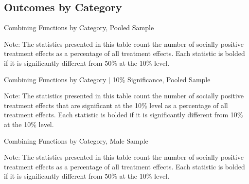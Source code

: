\subsection{{Outcomes by Category}} \label{appendix:morebycat}


	\begin{sidewaystable}[H]
	\begin{threeparttable}
     \caption{Combining Functions by Category, Pooled Sample} 
     \label{table:abccare_rslt_pooled_counts_n50a100_all}
	
		\begin{tablenotes}
	\footnotesize
	\item Note: The statistics presented in this table count the number of socially positive treatment 
	 effects as a percentage of all treatment effects. Each statistic is bolded if it is significantly
	 different from 50\% at the 10\% level.
	\end{tablenotes}
	\end{threeparttable}
	\end{sidewaystable}   

	\begin{sidewaystable}[H]
	\begin{threeparttable}
     \caption{Combining Functions by Category $|$ 10\% Significance, Pooled Sample} 
     \label{table:abccare_rslt_pooled_counts_n10a10_all}
	
	\begin{tablenotes}
	\footnotesize
	\item Note: The statistics presented in this table count the number of socially positive treatment 
	effects that are significant at the 10\% level as a percentage of all treatment effects. Each statistic
	is bolded if it is significantly different from 10\% at the 10\% level.
	\end{tablenotes}
	\end{threeparttable}
	\end{sidewaystable}   

	\begin{sidewaystable}[H]
	\begin{threeparttable}
     \caption{Combining Functions by Category, Male Sample} 
     \label{table:abccare_rslt_male_counts_n50a100_all}
	
		\begin{tablenotes}
	\footnotesize
	\item Note: The statistics presented in this table count the number of socially positive treatment 
	 effects as a percentage of all treatment effects. Each statistic is bolded if it is significantly
	 different from 50\% at the 10\% level.
	\end{tablenotes}
	\end{threeparttable}
	\end{sidewaystable}   

